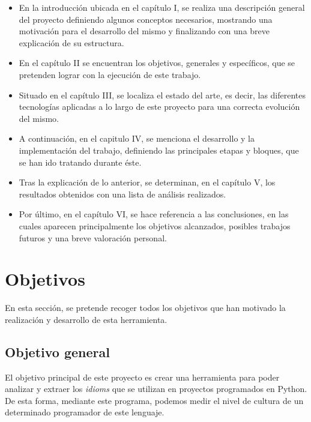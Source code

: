 \documentclass[a4paper, 12pt]{book}
\begin{document}
\begin{itemize}
\item En la introducción ubicada en el capítulo I, se realiza una descripción general del proyecto definiendo algunos conceptos necesarios, mostrando una motivación para el desarrollo del mismo y finalizando con una breve explicación de su estructura.
\item En el capítulo II se encuentran los objetivos, generales y específicos, que se pretenden lograr con la ejecución de este trabajo.
\item Situado en el capítulo III, se localiza el estado del arte, es decir, las diferentes tecnologías aplicadas a lo largo de este proyecto para una correcta evolución del mismo.
\item A continuación, en el capitulo IV, se menciona el desarrollo y la implementación del trabajo, definiendo las principales etapas y bloques, que se han ido tratando durante éste.
\item Tras la explicación de lo anterior, se determinan, en el capítulo V, los resultados obtenidos con una lista de análisis realizados.
\item Por último, en el capítulo VI, se hace referencia a las conclusiones, en las cuales aparecen principalmente los objetivos alcanzados, posibles trabajos futuros y una breve valoración personal.
\end{itemize}


\cleardoublepage
\chapter{Objetivos}
\label{chap:objetivos}

En esta sección, se pretende recoger todos los objetivos que han motivado la realización y desarrollo de esta herramienta.

\section{Objetivo general}
El objetivo principal de este proyecto es crear una herramienta para poder analizar y extraer los \textit{idioms} que se utilizan en proyectos programados en Python. De esta forma, mediante este programa, podemos medir el nivel de cultura de un determinado programador de este lenguaje.
\end{document}
